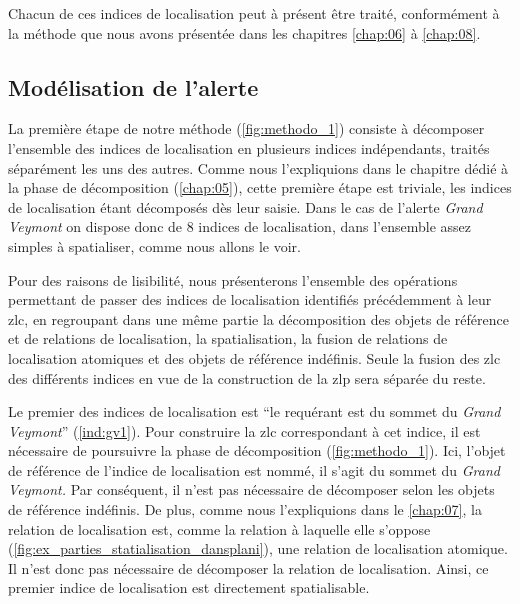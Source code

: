 Chacun de ces indices de localisation peut à présent être traité,
conformément à la méthode que nous avons présentée dans les chapitres
\ref{chap:06} à \ref{chap:08}.

\subsection{Modélisation de l'alerte}
\label{subsec:9-2-2}

La première étape de notre méthode (\autoref{fig:methodo_1}) consiste
à décomposer l'ensemble des indices de localisation en plusieurs
indices indépendants, traités séparément les uns des autres. Comme
nous l'expliquions dans le chapitre dédié à la phase de décomposition
(\autoref{chap:05}), cette première étape est triviale, les indices de
localisation étant décomposés dès leur saisie. Dans le cas de l'alerte
\emph{Grand Veymont} on dispose donc de 8 indices de localisation,
dans l'ensemble assez simples à spatialiser, comme nous allons le
voir.

Pour des raisons de lisibilité, nous présenterons l'ensemble des
opérations permettant de passer des indices de localisation identifiés
précédemment à leur \ac{zlc}, en regroupant dans une même partie la
décomposition des objets de référence et de relations de localisation,
la spatialisation, la fusion de relations de localisation atomiques et
des objets de référence indéfinis. Seule la fusion des \ac{zlc} des
différents indices en vue de la construction de la \ac{zlp} sera
séparée du reste.

Le premier des indices de localisation est \enquote{le requérant est
   du sommet du \emph{Grand
    Veymont}} (\ref{ind:gv1}). Pour construire la \ac{zlc}
correspondant à cet indice, il est nécessaire de poursuivre la phase
de décomposition (\autoref{fig:methodo_1}). Ici, l'objet de référence
de l'indice de localisation est nommé, il s'agit du sommet du
\emph{Grand Veymont.} Par conséquent, il n'est pas nécessaire de
décomposer selon les objets de référence indéfinis. De plus, comme
nous l'expliquions dans le \autoref{chap:07}, la relation de
localisation  est, comme la
relation  à laquelle elle s'oppose
(\autoref{fig:ex_parties_statialisation_dansplani}), une relation de
localisation atomique. Il n'est donc pas nécessaire de décomposer la
relation de localisation. Ainsi, ce premier indice de localisation est
directement spatialisable.

